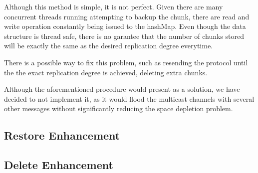 \documentclass[11pt]{article}
\begin{document}
Although this method is simple, it is not perfect.
Given there are many concurrent threads running attempting to backup the chunk, there are read and write operation constantly being issued to the hashMap.
Even though the data structure is thread safe, there is no garantee that the number of chunks stored will be exactly the same as the desired replication degree everytime.

There is a possible way to fix this problem, such as resending the protocol until the the exact replication degree is achieved, deleting extra chunks.

Although the aforementioned procedure would present as a solution, we have decided to not implement it, 
as it would flood the multicast channels with several other messages without significantly reducing the space depletion problem.





\subsection{Restore Enhancement}


\subsection{Delete Enhancement}




	
\end{document}
